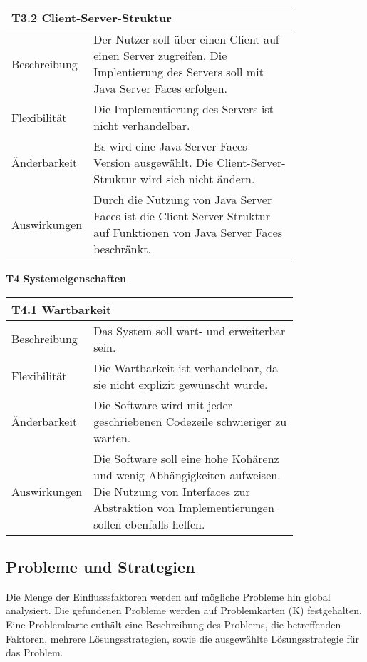 {%
\centering
\begin{tabular}{|l|p{0.8\linewidth}|}
\hline
\multicolumn{2}{|l|}{\textbf{T3.2 Client-Server-Struktur}}
  \tabularnewline \hline
Beschreibung                                               &  Der Nutzer soll über einen Client auf einen Server zugreifen. Die Implentierung des Servers soll mit Java Server Faces erfolgen.                                       \tabularnewline \hline
Flexibilität                                              & Die Implementierung des Servers ist nicht verhandelbar.                                                                                \tabularnewline \hline
Änderbarkeit                                         & Es wird eine Java Server Faces Version ausgewählt. Die Client-Server-Struktur wird sich nicht ändern.                                                        \tabularnewline \hline
Auswirkungen                                                &  Durch die Nutzung von Java Server Faces ist die Client-Server-Struktur auf Funktionen von Java Server Faces beschränkt.                                 \tabularnewline \hline
 \hline
\end{tabular}

\begin{flushleft}
\textbf{T4  Systemeigenschaften}
\end{flushleft}
\centering
\begin{tabular}{|l|p{0.8\linewidth}|}
\hline
\multicolumn{2}{|l|}{\textbf{T4.1 Wartbarkeit}}
  \tabularnewline \hline
Beschreibung                                               &  Das System soll wart- und erweiterbar sein. \tabularnewline \hline
Flexibilität                                              & Die Wartbarkeit ist verhandelbar, da sie nicht explizit gewünscht wurde.                                                                                \tabularnewline \hline
Änderbarkeit                                         & Die Software wird mit jeder geschriebenen Codezeile schwieriger zu warten.                                                       \tabularnewline \hline
Auswirkungen                                                & Die Software soll eine hohe Kohärenz und wenig Abhängigkeiten aufweisen. Die Nutzung von Interfaces zur Abstraktion von Implementierungen sollen ebenfalls helfen.                                \tabularnewline \hline
 \hline
\end{tabular}


\subsection{Probleme und Strategien} \label{sec:strategien}
Die Menge der Einflusssfaktoren werden auf mögliche Probleme hin global analysiert. Die gefundenen Probleme werden  auf Problemkarten (K) festgehalten. Eine Problemkarte enthält eine Beschreibung des Problems, die betreffenden Faktoren, mehrere Lösungsstrategien, sowie die ausgewählte Lösungsstrategie für das Problem.

}
